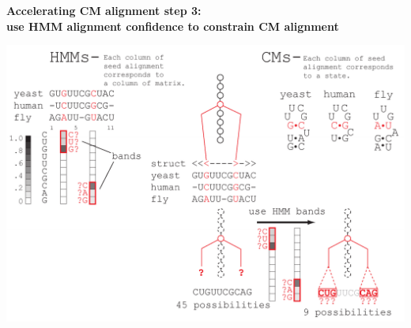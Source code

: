 \documentclass[landscape]{slides}
\begin{document}
\begin{slide}
\begin{center}

\textbf{Accelerating CM alignment step 3: \\ use HMM alignment
  confidence to constrain CM alignment}
\end{center}
\medskip
\small
\begin{center}
\includegraphics[width=8in]{figs/post_hmm_to_cm_map2_layer16}
\end{center}
\vfill
\end{slide}
\begin{slide}
\end{slide}
\end{document}
